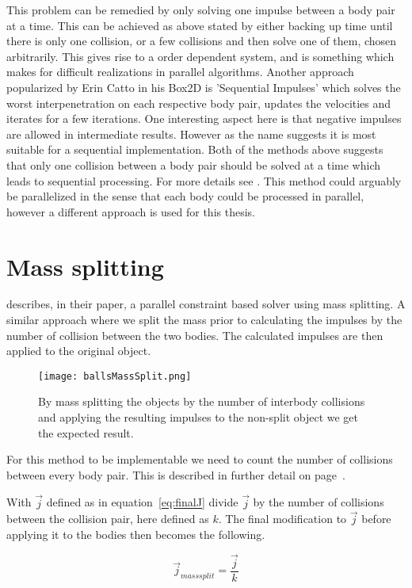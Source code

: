 This problem can be remedied by only solving one impulse between a body pair at a time.
This can be achieved as above stated by either backing up time until there
is only one collision, or a few collisions and then solve one of them, chosen
arbitrarily. This gives rise to a order dependent system, and is something which
makes for difficult realizations in parallel algorithms. Another approach popularized
by Erin Catto in his Box2D is 'Sequential Impulses' which solves the worst interpenetration
on each respective body pair, updates the velocities and iterates for a few iterations.
One interesting aspect here is that negative impulses are allowed in intermediate
results. However as the name suggests it is most suitable for a sequential implementation.
Both of the methods above suggests that only one collision between a body pair should
be solved at a time which leads to sequential processing. For more details see \cite{catto}.
This method could arguably be parallelized in the sense that each body could be
processed in parallel, however a different approach is used for this thesis.

\section{Mass splitting}\label{sec:massSplit}
\cite{tonge} describes, in their paper, a parallel constraint based solver
using mass splitting. A similar approach where we split the mass prior to
calculating the impulses by the number of collision between the two bodies. The
calculated impulses are then applied to the original object.

\begin{figure}[H]
  \centering
  \texttt{[image: ballsMassSplit.png]}
  \caption{By mass splitting the objects by the number of interbody collisions
  and applying the resulting impulses to the non-split object we get the expected result.}
  \label{fig:massSplit}
\end{figure}

For this method to be implementable we need to count the number of collisions between
every body pair. This is described in further detail on page~\pageref{sec:colMatrix}.

With $\vec{j}$ defined as in equation~\ref{eq:finalJ} divide $\vec{j}$ by
the number of collisions between the collision pair, here defined as $k$. The final modification to
$\vec{j}$ before applying it to the bodies then becomes the following.

\begin{equation}
  \vec{j}_{mass split} = \frac{\vec{j}}{k}
\end{equation}

